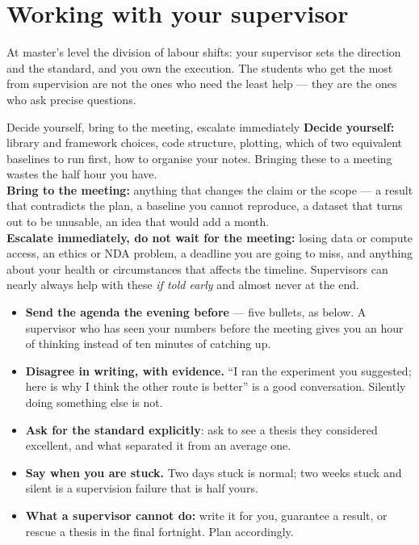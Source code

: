 \documentclass[11pt,a4paper]{article}
\begin{document}
\section{Working with your supervisor}

At master's level the division of labour shifts: your supervisor sets the
direction and the standard, and you own the execution. The students who get
the most from supervision are not the ones who need the least help --- they
are the ones who ask precise questions.

\begin{cbox}{Decide yourself, bring to the meeting, escalate immediately}
\textbf{Decide yourself:} library and framework choices, code structure,
plotting, which of two equivalent baselines to run first, how to organise your
notes. Bringing these to a meeting wastes the half hour you have.\\[4pt]
\textbf{Bring to the meeting:} anything that changes the claim or the scope ---
a result that contradicts the plan, a baseline you cannot reproduce, a
dataset that turns out to be unusable, an idea that would add a month.\\[4pt]
\textbf{Escalate immediately, do not wait for the meeting:} losing data or
compute access, an ethics or NDA problem, a deadline you are going to miss,
and anything about your health or circumstances that affects the timeline.
Supervisors can nearly always help with these \emph{if told early} and almost
never at the end.
\end{cbox}

\begin{itemize}
  \item \textbf{Send the agenda the evening before} --- five bullets, as
        below. A supervisor who has seen your numbers before the meeting gives
        you an hour of thinking instead of ten minutes of catching up.
  \item \textbf{Disagree in writing, with evidence.} ``I ran the experiment
        you suggested; here is why I think the other route is better'' is a
        good conversation. Silently doing something else is not.
  \item \textbf{Ask for the standard explicitly}: ask to see a thesis they
        considered excellent, and what separated it from an average one.
  \item \textbf{Say when you are stuck.} Two days stuck is normal; two weeks
        stuck and silent is a supervision failure that is half yours.
  \item \textbf{What a supervisor cannot do:} write it for you, guarantee a
        result, or rescue a thesis in the final fortnight. Plan accordingly.
\end{itemize}
\end{document}
